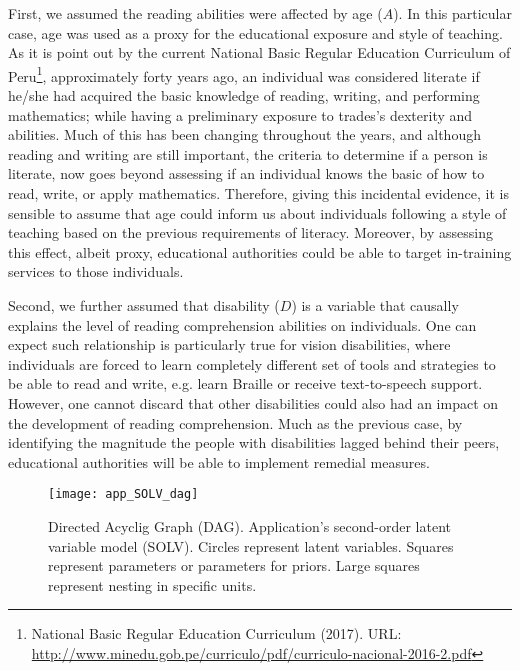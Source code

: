 First, we assumed the reading abilities were affected by age ($A$). In this particular case, age was used as a proxy for the educational exposure and style of teaching. As it is point out by the current National Basic Regular Education Curriculum of Peru\footnote{National Basic Regular Education Curriculum (2017). URL: \url{ http://www.minedu.gob.pe/curriculo/pdf/curriculo-nacional-2016-2.pdf} }, approximately forty years ago, an individual was considered literate if he/she had acquired the basic knowledge of reading, writing, and performing mathematics; while having a preliminary exposure to trades's dexterity and abilities. Much of this has been changing throughout the years, and although reading and writing are still important, the criteria to determine if a person is literate, now goes beyond assessing if an individual knows the basic of how to read, write, or apply mathematics. Therefore, giving this incidental evidence, it is sensible to assume that age could inform us about individuals following a style of teaching based on the previous requirements of literacy. Moreover, by assessing this effect, albeit proxy, educational authorities could be able to target in-training services to those individuals.

Second, we further assumed that disability ($D$) is a variable that causally explains the level of reading comprehension abilities on individuals. One can expect such relationship is particularly true for vision disabilities, where individuals are forced to learn completely different set of tools and strategies to be able to read and write, e.g. learn Braille or receive text-to-speech support. However, one cannot discard that other disabilities could also had an impact on the development of reading comprehension. Much as the previous case, by identifying the magnitude the people with disabilities lagged behind their peers, educational authorities will be able to implement remedial measures.
%
\begin{figure}[H]
	\centering
	\texttt{[image: app\_SOLV\_dag]}
	\caption[Directed Acyclic Graph (DAG). Application's second-order latent variable model (SOLV).]%
	{Directed Acyclig Graph (DAG). Application's second-order latent variable model (SOLV). Circles represent latent variables. Squares represent parameters or parameters for priors. Large squares represent nesting in specific units.}
	\label{fig:SOLV_app}
\end{figure}

